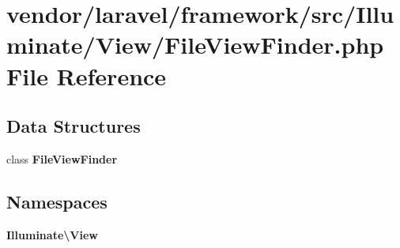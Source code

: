 \section{vendor/laravel/framework/src/\+Illuminate/\+View/\+File\+View\+Finder.php File Reference}
\label{_file_view_finder_8php}
\subsection*{Data Structures}
\begin{DoxyCompactItemize}
\item 
class {\bf File\+View\+Finder}
\end{DoxyCompactItemize}
\subsection*{Namespaces}
\begin{DoxyCompactItemize}
\item 
 {\bf Illuminate\textbackslash{}\+View}
\end{DoxyCompactItemize}

